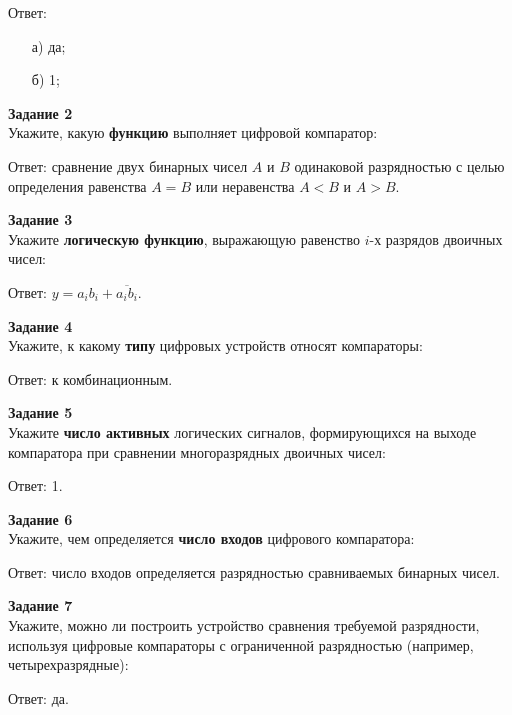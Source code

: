 \documentclass[spec, och, labwork]{shiza}
\begin{document}
    Ответ:
    \begin{enumerate}
        \item[а)] да;
        \item[б)] 1;
    \end{enumerate}

\textbf{Задание 2}\\
    Укажите, какую \textbf{функцию} выполняет цифровой компаратор:
    
    Ответ: сравнение двух бинарных чисел $A$ и $B$ одинаковой разрядностью с целью определения равенства $A = B$ или
    неравенства $A < B$ и $A > B$.

\textbf{Задание 3}\\
    Укажите \textbf{логическую функцию}, выражающую равенство $i$-х разрядов двоичных чисел:

    Ответ: $y = a_i b_i + \overline{a_i b_i}$.
    
\textbf{Задание 4}\\
     Укажите, к какому \textbf{типу} цифровых устройств относят компараторы: 

     Ответ: к комбинационным.

\textbf{Задание 5}\\
    Укажите \textbf{число активных} логических сигналов, формирующихся на выходе компаратора при сравнении многоразрядных двоичных чисел:

    Ответ: 1.
    
\textbf{Задание 6}\\
    Укажите, чем определяется \textbf{число входов} цифрового компаратора:

    Ответ: число входов определяется разрядностью сравниваемых бинарных чисел.
    
\textbf{Задание 7}\\
    Укажите, можно ли построить устройство сравнения требуемой разрядности, используя цифровые компараторы с
    ограниченной разрядностью (например, четырехразрядные):

    Ответ: да.
\end{document}
